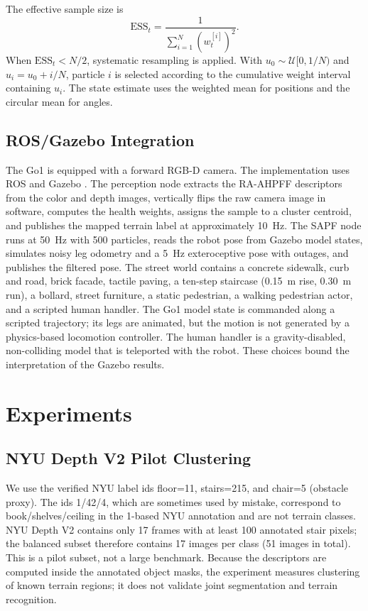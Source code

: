 \documentclass[final,3p,times]{elsarticle}
\begin{document}
The effective sample size is
\begin{equation}
    \mathrm{ESS}_t = \frac{1}{\sum_{i=1}^{N}(w^{[i]}_t)^2}.
    \label{eq:ess}
\end{equation}
When $\mathrm{ESS}_t < N/2$, systematic resampling is applied. With $u_0\sim\mathcal{U}[0,1/N)$ and $u_i=u_0+i/N$, particle $i$ is selected according to the cumulative weight interval containing $u_i$. The state estimate uses the weighted mean for positions and the circular mean for angles.

\subsection{ROS/Gazebo Integration}
The Go1 is equipped with a forward RGB-D camera. The implementation uses ROS \cite{quigley2009ros} and Gazebo \cite{koenig2004design}. The perception node extracts the RA-AHPFF descriptors from the color and depth images, vertically flips the raw camera image in software, computes the health weights, assigns the sample to a cluster centroid, and publishes the mapped terrain label at approximately 10~Hz. The SAPF node runs at 50~Hz with 500 particles, reads the robot pose from Gazebo model states, simulates noisy leg odometry and a 5~Hz exteroceptive pose with outages, and publishes the filtered pose. The street world contains a concrete sidewalk, curb and road, brick facade, tactile paving, a ten-step staircase (0.15~m rise, 0.30~m run), a bollard, street furniture, a static pedestrian, a walking pedestrian actor, and a scripted human handler. The Go1 model state is commanded along a scripted trajectory; its legs are animated, but the motion is not generated by a physics-based locomotion controller. The human handler is a gravity-disabled, non-colliding model that is teleported with the robot. These choices bound the interpretation of the Gazebo results.

\section{Experiments}
\label{sec:experiments}

\subsection{NYU Depth V2 Pilot Clustering}
\label{subsec:nyu}
We use the verified NYU label ids floor=11, stairs=215, and chair=5 (obstacle proxy). The ids 1/42/4, which are sometimes used by mistake, correspond to book/shelves/ceiling in the 1-based NYU annotation and are not terrain classes. NYU Depth V2 \cite{silberman2012indoor} contains only 17 frames with at least 100 annotated stair pixels; the balanced subset therefore contains 17 images per class (51 images in total). This is a pilot subset, not a large benchmark. Because the descriptors are computed inside the annotated object masks, the experiment measures clustering of known terrain regions; it does not validate joint segmentation and terrain recognition.
\end{document}
